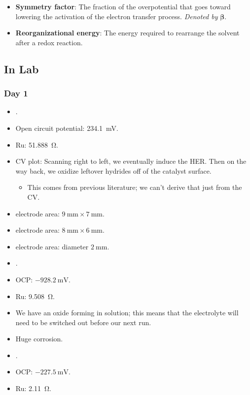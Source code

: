 \documentclass[../notes.tex]{subfiles}
\begin{document}
\begin{itemize}
\begin{itemize}
        \begin{equation*}
            \text{Tafel slope} = \frac{2.3RT}{\beta F}
        \end{equation*}
        \item We take $\beta=0.5$ for processes such as this one with high \textbf{reorganizational energy}.
        \item Derivation that Volmer-Tafel has a slope of 30 mV/log j and Volmer Heyrovsky has a slope of 120 mV/log j.
    \end{itemize}
    \item \textbf{Symmetry factor}: The fraction of the overpotential that goes toward lowering the activation of the electron transfer process. \emph{Denoted by} $\bm{\beta}$.
    \item \textbf{Reorganizational energy}: The energy required to rearrange the solvent after a redox reaction.
\end{itemize}


\subsection*{In Lab}
\subsubsection*{Day 1}
\begin{itemize}
    \item {}.
    \item Open circuit potential: \SI{234.1}{\milli\volt}.
    \item Ru: \SI{51.888}{\ohm}.
    \item CV plot: Scanning right to left, we eventually induce the HER. Then on the way back, we oxidize leftover hydrides off of the catalyst surface.
    \begin{itemize}
        \item This comes from previous literature; we can't derive that just from the CV.
    \end{itemize}
    \item {} electrode area: $\SI{9}{\milli\meter}\times\SI{7}{\milli\meter}$.
    \item {} electrode area: $\SI{8}{\milli\meter}\times\SI{6}{\milli\meter}$.
    \item {} electrode area: diameter $\SI{2}{\milli\meter}$.
    \item {}.
    \item OCP: $-\SI{928.2}{\milli\volt}$.
    \item Ru: \SI{9.508}{\ohm}.
    \item We have an oxide forming in solution; this means that the electrolyte will need to be switched out before our next run.
    \item Huge corrosion.
    \item {}.
    \item OCP: $-\SI{227.5}{\milli\volt}$.
    \item Ru: \SI{2.11}{\ohm}.
\end{itemize}
\end{document}
